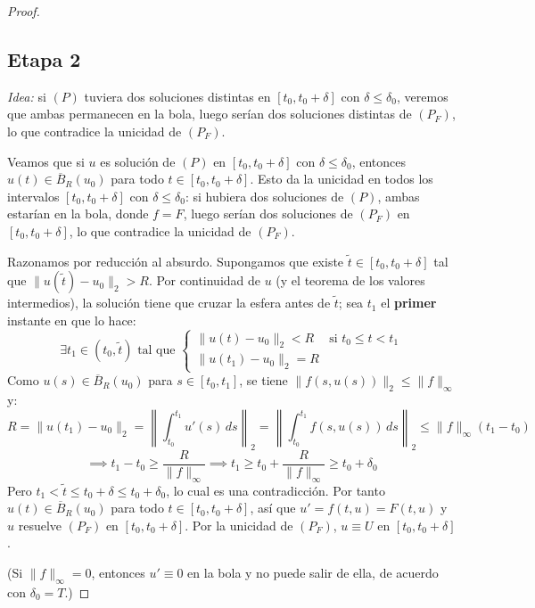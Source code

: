 \begin{proof}
    \subsection*{Etapa 2}

    \textit{Idea:} si $(P)$ tuviera dos soluciones distintas en $[t_0, t_0 + \delta]$ con $\delta \leq \delta_0$, veremos que ambas permanecen en la bola, luego serían dos soluciones distintas de $(P_F)$, lo que contradice la unicidad de $(P_F)$.

    Veamos que si $u$ es solución de $(P)$ en $[t_0, t_0 + \delta]$ con $\delta \leq \delta_0$, entonces $u(t) \in \overline{B}_R(u_0)$ para todo $t \in [t_0, t_0 + \delta]$. Esto da la unicidad en todos los intervalos $[t_0, t_0 + \delta]$ con $\delta \leq \delta_0$: si hubiera dos soluciones de $(P)$, ambas estarían en la bola, donde $f = F$, luego serían dos soluciones de $(P_F)$ en $[t_0, t_0 + \delta]$, lo que contradice la unicidad de $(P_F)$.

    Razonamos por reducción al absurdo. Supongamos que existe $\widetilde{t} \in [t_0, t_0 + \delta]$ tal que $\| u(\widetilde{t}) - u_0 \|_2 > R$. Por continuidad de $u$ (y el teorema de los valores intermedios), la solución tiene que cruzar la esfera antes de $\widetilde{t}$; sea $t_1$ el \textbf{primer} instante en que lo hace:
    \[
        \exists t_1 \in (t_0, \widetilde{t}) \text{ tal que }
        \begin{cases}
            \| u(t) - u_0 \|_2 < R & \text{si } t_0 \leq t < t_1 \\
            \| u(t_1) - u_0 \|_2 = R
        \end{cases}
    \]
    Como $u(s) \in \overline{B}_R(u_0)$ para $s \in [t_0, t_1]$, se tiene $\| f(s, u(s)) \|_2 \leq \| f \|_\infty$ y:
    \[
        R = \| u(t_1) - u_0 \|_2 =
        \left\| \int_{t_0}^{t_1} u'(s) \, ds \right\|_2 =
        \left\| \int_{t_0}^{t_1} f(s, u(s)) \, ds \right\|_2 \leq
        \| f \|_\infty (t_1 - t_0)
    \]
    \[
        \implies
        t_1 - t_0 \geq \frac{R}{\| f \|_\infty} \implies
        t_1 \geq t_0 + \frac{R}{\| f \|_\infty} \geq t_0 + \delta_0
    \]
    Pero $t_1 < \widetilde{t} \leq t_0 + \delta \leq t_0 + \delta_0$, lo cual es una contradicción. Por tanto $u(t) \in \overline{B}_R(u_0)$ para todo $t \in [t_0, t_0 + \delta]$, así que $u' = f(t, u) = F(t, u)$ y $u$ resuelve $(P_F)$ en $[t_0, t_0 + \delta]$. Por la unicidad de $(P_F)$, $u \equiv U$ en $[t_0, t_0 + \delta]$.

    (Si $\| f \|_\infty = 0$, entonces $u' \equiv 0$ en la bola y no puede salir de ella, de acuerdo con $\delta_0 = T$.)


\end{proof}
